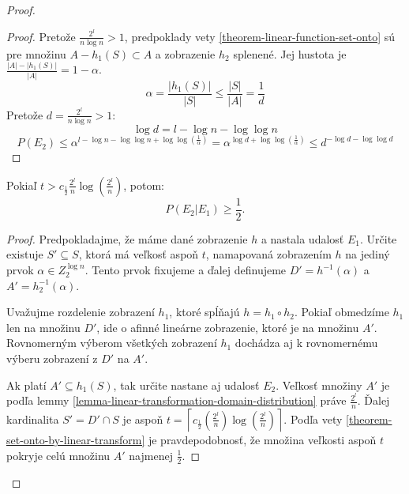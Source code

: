 \begin{proof}
\begin{proof}
Pretože $\frac{2^l}{n \log n} > 1$, predpoklady vety \ref{theorem-linear-function-set-onto} sú pre množinu $A - h_1(S) \subset A$ a zobrazenie $h_2$ splenené.
Jej hustota je $\frac{|A| - |h_1(S)|}{|A|} = 1 - \alpha$.
\begin{displaymath}
\alpha = \frac{|h_1(S)|}{|S|} \leq \frac{|S|}{|A|} = \frac{1}{d}
\end{displaymath}
Pretože $d = \frac{2^l}{n \log n} > 1$:
\begin{displaymath}
\log d = l - \log n - \log \log n
\end{displaymath}
\begin{displaymath}
P(E_2) \leq \alpha^{l - \log n - \log \log n + \log \log \left(\frac{1}{\alpha}\right)} = \alpha ^ {\log d + \log \log \left(\frac{1}{\alpha}\right)} \leq d^{-\log d - \log \log d}
\end{displaymath}
\end{proof}

\begin{remark}
\label{remark-prob-t-length-chain}
Pokiaľ $t > c_{\frac{1}{2}}{\frac{2^l}{n}}\log\left(\frac{2^l}{n}\right)$, potom:
\begin{displaymath}
P(E_2 | E_1) \geq \frac{1}{2} \textit{.}
\end{displaymath}
\end{remark}
\begin{proof}
Predpokladajme, že máme dané zobrazenie $h$ a nastala udalosť $E_1$. Určite existuje $S' \subseteq S$, ktorá má veľkosť aspoň $t$, namapovaná zobrazením $h$ na jediný prvok $\alpha \in Z_2^{\log n}$. Tento prvok fixujeme a ďalej definujeme $D' = h^{-1}(\alpha)$ a $A' = h_2^{-1}(\alpha)$. 

Uvažujme rozdelenie zobrazení $h_1$, ktoré spĺňajú $h = h_1 \circ h_2$. Pokiaľ obmedzíme $h_1$ len na množinu $D'$, ide o afinné lineárne zobrazenie, ktoré je na množinu $A'$. Rovnomerným výberom všetkých zobrazení $h_1$ dochádza aj k rovnomernému výberu zobrazení z $D'$ na $A'$.

Ak platí $A' \subseteq h_1(S)$, tak určite nastane aj udalosť $E_2$. Veľkosť množiny $A'$ je podľa lemmy \ref{lemma-linear-transformation-domain-distribution} práve $\frac{2^l}{n}$. Ďalej kardinalita $S' = D' \cap S$ je aspoň $t = \left\lceil c_{\frac{1}{2}}\left(\frac{2^l}{n}\right)\log\left(\frac{2^l}{n}\right)\right\rceil$. Podľa vety \ref{theorem-set-onto-by-linear-transform} je pravdepodobnosť, že množina veľkosti aspoň $t$ pokryje celú množinu $A'$ najmenej $\frac{1}{2}$.
\end{proof}


\end{proof}
